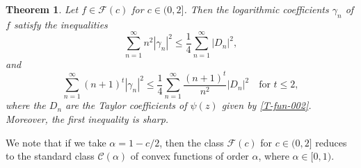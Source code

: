 \documentclass[a4paper,12pt]{amsart}
\newtheorem{thm}{Theorem}[section]
\newtheorem{cor}{Corollary}[section]
\theoremstyle{definition}
\begin{document}
\begin{thm}\label{T-thm-001}
Let $ f \in \mathcal{F}(c) $ for $ c \in (0, 2]$. Then the logarithmic coefficients $\gamma_n$ of $ f $ satisfy the inequalities  
$$
\sum_{n=1}^{\infty} n^2 |\gamma_n|^2 \leq \frac{1}{4} \sum_{n=1}^{\infty} |D_n|^2,
$$
and  
$$
\sum_{n=1}^{\infty} (n+1)^t |\gamma_n|^2 \leq \frac{1}{4} \sum_{n=1}^{\infty} \frac{(n+1)^t}{n^2} |D_n|^2 \quad \text{for } t \leq 2,
$$
where the $D_n$ are the Taylor coefficients of $\psi(z)$ given by \eqref{T-fun-002}. Moreover, the first inequality is sharp.
\end{thm}

We note that if we take $\alpha = 1 - c/2$, then the class $\mathcal{F}(c)$ for $c \in (0, 2]$ reduces to the standard class $\mathcal{C}(\alpha)$ of convex functions of order $\alpha$, where $\alpha \in [0, 1)$.

\end{document}
